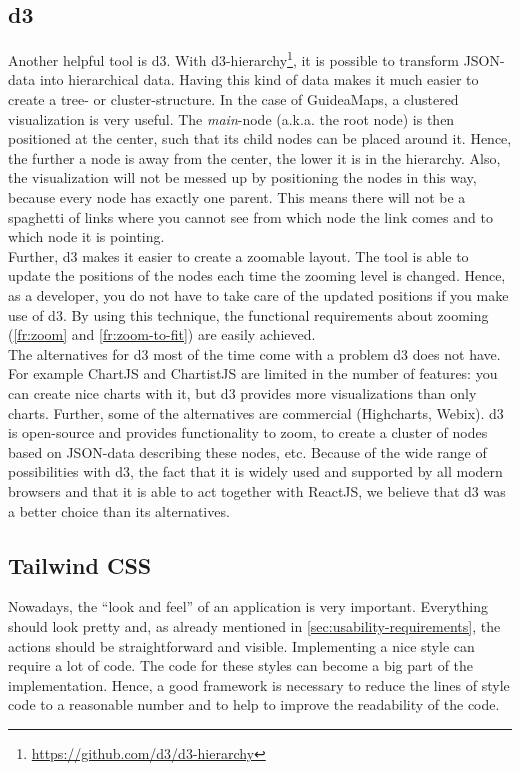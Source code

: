 \subsection{d3}\label{sec:d3}
Another helpful tool is d3. With d3-hierarchy\footnote{\url{https://github.com/d3/d3-hierarchy}}, it is possible to transform JSON-data into hierarchical data. Having this kind of data makes it much easier to create a tree- or cluster-structure. In the case of GuideaMaps, a clustered visualization is very useful. The \textit{main}-node (a.k.a. the root node) is then positioned at the center, such that its child nodes can be placed around it. Hence, the further a node is away from the center, the lower it is in the hierarchy. Also, the visualization will not be messed up by positioning the nodes in this way, because every node has exactly one parent. This means there will not be a spaghetti of links where you cannot see from which node the link comes and to which node it is pointing.\\

Further, d3 makes it easier to create a zoomable layout. The tool is able to update the positions of the nodes each time the zooming level is changed. Hence, as a developer, you do not have to take care of the updated positions if you make use of d3. By using this technique, the functional requirements about zooming (\ref{fr:zoom} and \ref{fr:zoom-to-fit}) are easily achieved.\\

The alternatives for d3 most of the time come with a problem d3 does not have. For example ChartJS and ChartistJS are limited in the number of features: you can create nice charts with it, but d3 provides more visualizations than only charts. Further, some of the alternatives are commercial (Highcharts, Webix). d3 is open-source and provides functionality to zoom, to create a cluster of nodes based on JSON-data describing these nodes, etc. Because of the wide range of possibilities with d3, the fact that it is widely used and supported by all modern browsers and that it is able to act together with ReactJS, we believe that d3 was a better choice than its alternatives. 

\subsection{Tailwind CSS}\label{sec:tailwind}
Nowadays, the ``look and feel'' of an application is very important. Everything should look pretty and, as already mentioned in \autoref{sec:usability-requirements}, the actions should be straightforward and visible. Implementing a nice style can require a lot of code. The code for these styles can become a big part of the implementation. Hence, a good framework is necessary to reduce the lines of style code to a reasonable number and to help to improve the readability of the code.\\

